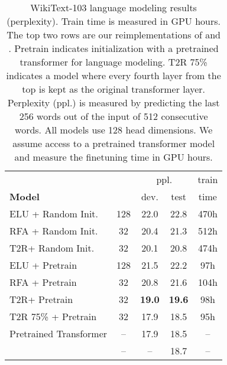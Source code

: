 \documentclass[11pt]{article}
\newcommand{\TRNN}{T2R\xspace}
\begin{document}
\begin{table}[h]
\centering
\addtolength{\tabcolsep}{-2.6pt}  
\begin{tabular}{@{} lcccc @{}}
\toprule
 & &  \multicolumn{2}{c}{ppl.} & train \\
\cmidrule(lr){3-4} \textbf{Model}&  &dev.  & test & time \\
\hline
ELU + Random Init. & 128 & 22.0 & 22.8 & 470h \\
RFA + Random Init. & 32 & 20.4 & 21.3 & 512h\\
\TRNN + Random Init. & 32 & 20.1 & 20.8 & 474h\\
\hdashline
ELU + Pretrain & 128  & 21.5 & 22.2 &97h \\
RFA + Pretrain & 32 & 20.8 & 21.6 & 104h \\
\TRNN + Pretrain & 32 & \textbf{19.0} & \textbf{19.6} & 98h \\
\hdashline
\TRNN 75\% + Pretrain & 32 & 17.9 &18.5  &  95h\\
\hline
Pretrained Transformer  & -- & 17.9 & 18.5 &  --\\

\citet{Baevski2019AdaptiveIR}  & -- & -- & 18.7 & --\\
\bottomrule
\end{tabular}
\caption{
WikiText-103 language modeling results (perplexity). Train time is measured in GPU hours. The top two rows are our reimplementations of \citet{katharopoulos-et-al-2020} and \citet{RFA}. Pretrain indicates initialization with a pretrained transformer for language modeling. \TRNN 75\% indicates a model where every fourth layer from the top is kept as the original transformer layer. Perplexity (ppl.) is measured by predicting the last 256 words out of the input of 512 consecutive words. All models use 128 head dimensions. We assume access to a pretrained transformer model and measure the finetuning time in GPU hours. }
\label{lm_results}
\end{table}
\end{document}
